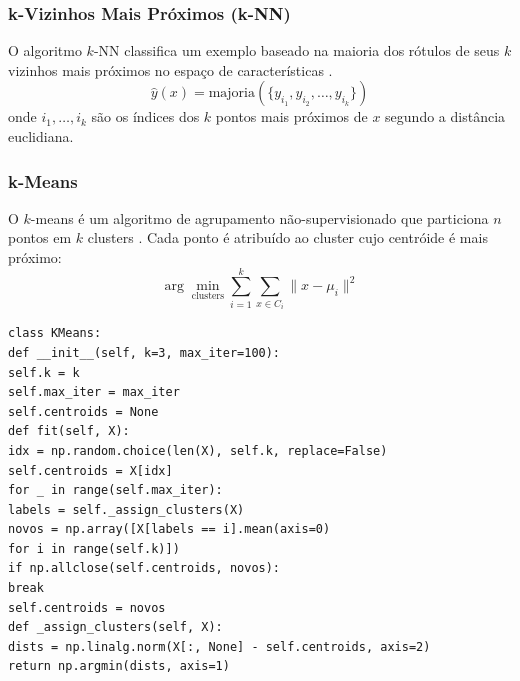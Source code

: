 \subsubsection{k-Vizinhos Mais Próximos (k-NN)}
O algoritmo $k$-NN classifica um exemplo baseado na maioria dos rótulos de
seus $k$ vizinhos mais próximos no espaço de características
\cite{fix1989discriminatory}.
\[\hat{y}(x) = \text{majoria}\left(\{y_{i_1}, y_{i_2}, \ldots, y_{i_k}\}\right)
\]
onde $i_1, \ldots, i_k$ são os índices dos $k$ pontos mais próximos de $x$
segundo a distância euclidiana.
\subsubsection{k-Means}
O $k$-means é um algoritmo de agrupamento não-supervisionado que particiona
$n$ pontos em $k$ clusters \cite{lloyd1982least}. Cada ponto é atribuído ao
cluster cujo centróide é mais próximo:
\[\arg\min_{\text{clusters}} \sum_{i=1}^k \sum_{x \in C_i} \|x - \mu_i\|^2
\]
\begin{lstlisting}[style=pythonstyle]
class KMeans:
def __init__(self, k=3, max_iter=100):
self.k = k
self.max_iter = max_iter
self.centroids = None
def fit(self, X):
idx = np.random.choice(len(X), self.k, replace=False)
self.centroids = X[idx]
for _ in range(self.max_iter):
labels = self._assign_clusters(X)
novos = np.array([X[labels == i].mean(axis=0)
for i in range(self.k)])
if np.allclose(self.centroids, novos):
break
self.centroids = novos
def _assign_clusters(self, X):
dists = np.linalg.norm(X[:, None] - self.centroids, axis=2)
return np.argmin(dists, axis=1)
\end{lstlisting}
